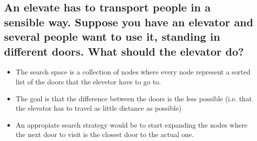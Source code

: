 \documentclass[paper=a4, fontsize=11pt]{scrartcl} %
\numberwithin{equation}{section} %
\numberwithin{figure}{section} %
\numberwithin{table}{section} %
\begin{document}
\subsection{An elevate has to transport people in a sensible way. Suppose you have an elevator and several people want to use it, standing in different doors. What should the elevator do?}

\begin{itemize}
	\item The search space is a collection of nodes where every node represent a sorted list of the doors that the elevetor have to go to.
	\item The goal is that the difference between the doors is the less possible (i.e. that the elevator has to travel as little distance as possible)
	\item An appropiate search strategy would be to start expanding the nodes where the next door to visit is the closest door to the actual one.	
\end{itemize}




\end{document}
